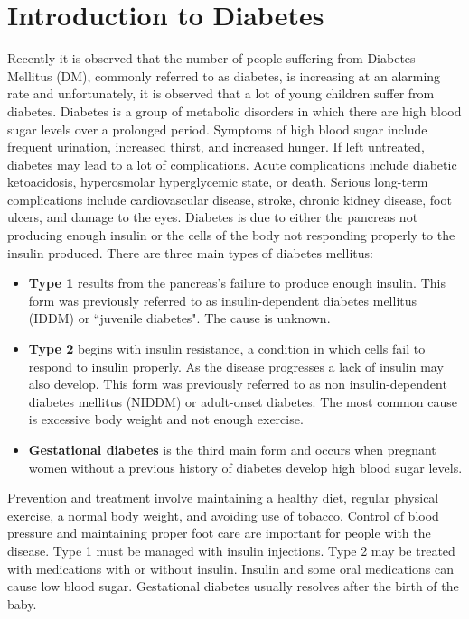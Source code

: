 \section{Introduction to Diabetes}
Recently it is observed that the number of people suffering from Diabetes Mellitus (DM), commonly referred to as diabetes, is increasing at an alarming rate and unfortunately, it is observed that a lot of young children suffer from diabetes. Diabetes is a group of metabolic disorders in which there are high blood sugar levels over a prolonged period. Symptoms of high blood sugar include frequent urination, increased thirst, and increased hunger. If left untreated, diabetes may lead to a lot of complications. Acute complications include diabetic ketoacidosis, hyperosmolar hyperglycemic state, or death. Serious long-term complications include cardiovascular disease, stroke, chronic kidney disease, foot ulcers, and damage to the eyes. Diabetes is due to either the pancreas not producing enough insulin or the cells of the body not responding properly to the insulin produced. There are three main types of diabetes mellitus:
\begin{itemize}
\item \textbf{Type 1} results from the pancreas's failure to produce enough insulin. This form was previously referred to as insulin-dependent diabetes mellitus (IDDM) or ``juvenile diabetes". The cause is unknown.
\item \textbf{Type 2} begins with insulin resistance, a condition in which cells fail to respond to insulin properly. As the disease progresses a lack of insulin may also develop. This form was previously referred to as non insulin-dependent diabetes mellitus (NIDDM) or adult-onset diabetes. The most common cause is excessive body weight and not enough exercise. 
\item \textbf{Gestational diabetes} is the third main form and occurs when pregnant women without a previous history of diabetes develop high blood sugar levels.
\end{itemize}
\par\noindent
Prevention and treatment involve maintaining a healthy diet, regular physical exercise, a normal body weight, and avoiding use of tobacco. Control of blood pressure and maintaining proper foot care are important for people with the disease. Type 1 must be managed with insulin injections. Type 2 may be treated with medications with or without insulin. Insulin and some oral medications can cause low blood sugar. Gestational diabetes usually resolves after the birth of the baby.\par\noindent

